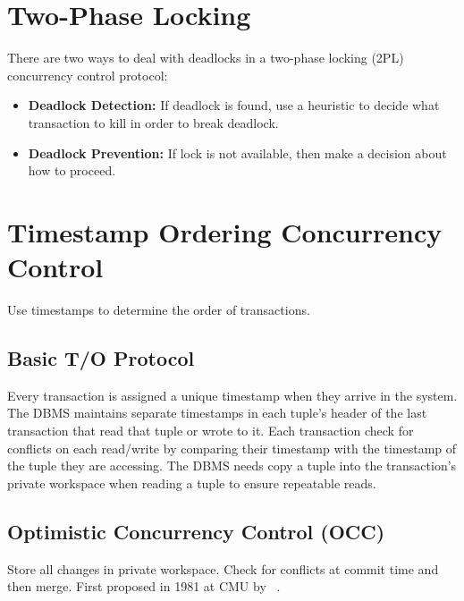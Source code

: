 \documentclass[11pt]{article}
\begin{document}
\section{Two-Phase Locking}
There are two ways to deal with deadlocks in a two-phase locking (2PL) concurrency control protocol:

\begin{itemize}
    \item \textbf{Deadlock Detection:}
    If deadlock is found, use a heuristic to decide what transaction to kill in order to break 
    deadlock.
    
    \item \textbf{Deadlock Prevention:}
    If lock is not available, then make a decision about how to proceed.
\end{itemize}

\section{Timestamp Ordering Concurrency Control}
Use timestamps to determine the order of transactions.

\subsection*{Basic T/O Protocol}
Every transaction is assigned a unique timestamp when they arrive in the system.
The DBMS maintains separate timestamps in each tuple's header of the last transaction that read 
that tuple or wrote to it.
Each transaction check for conflicts on each read/write by comparing their timestamp with the 
timestamp of the tuple they are accessing.
%     
The DBMS needs copy a tuple into the transaction's private workspace when reading a tuple to 
ensure repeatable reads.

\subsection*{Optimistic Concurrency Control (OCC)}
Store all changes in private workspace.
Check for conflicts at commit time and then merge.
First proposed in 1981 at CMU by \citeauthor{p213-kung}~\cite{p213-kung}.
\end{document}
